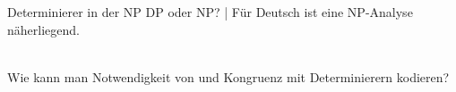 \begin{frame}
  {Determinierer in der NP}
  \onslide<+->
  \onslide<+->
  DP oder NP? | \alert{Für Deutsch ist eine NP-Analyse näherliegend.}\\
  \onslide<+->
  \Zeile
  \\
  \onslide<+->
  \Zeile
  Wie kann man \alert{Notwendigkeit von} und \alert{Kongruenz mit Determinierern} kodieren?
  \onslide<+->
  \onslide<+->
\end{frame}

\newcommand{\AvmA}{%
  \begin{avm}
    \[ \asort{nomen}
    graphen & \textit{Tischs} \\
    person & \gruen{\@1 dritte} \\
    genus & \gruen{\@2 maskulin} \\
    numerus & \gruen{\@3 singular} \\
    kasus & \gruen{\@4 genitiv} \\
    valenz & \<\[ \asort{determinierer} 
      genus & \ \gruen{\@2} \\
      numerus & \gruen{\@3} \\
      kasus & \ \gruen{\@4}
                           \]\>
  \]
  \end{avm}%
}

\newcommand{\AvmB}{%
  \begin{avm}
    \[ \asort{determinierer}
      graphen & \textit{des} \\
       genus & \gruen{\@2} \\
       numerus & \gruen{\@3} \\
       kasus & \gruen{\@4} \\
       valenz & \<\>
    \]
  \end{avm}
}

